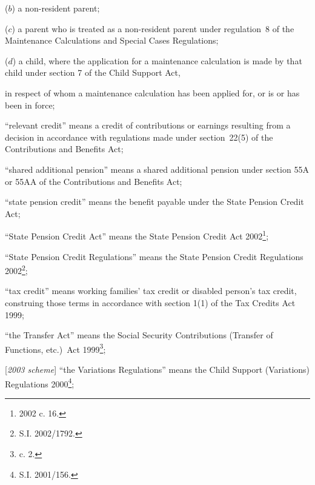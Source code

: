 \documentclass[12pt,a4paper]{article}
\begin{document}
\begin{enumerate}
\begin{enumerate}
    ($b$) 
    a non-resident parent;

    ($c$) 
    a parent who is treated as a non-resident parent under regulation~8 of the Maintenance Calculations and Special Cases Regulations;

    ($d$) 
    a child, where the application for a maintenance calculation is made by that child under section 7 of the Child Support Act,
\end{enumerate}
    in respect of whom a maintenance calculation has been applied for, 
or is or has been in force;

“relevant credit” means a credit of contributions or earnings resulting from a decision in accordance with regulations made under section~22(5) of the Contributions and Benefits Act;

“shared additional pension” means a shared additional pension under section 55A or 55AA of the Contributions and Benefits Act;

“state pension credit” means the benefit payable under the State Pension Credit Act;

“State Pension Credit Act” means the State Pension Credit Act 2002\footnote{2002 c. 16.};

“State Pension Credit Regulations” means the State Pension Credit Regulations 2002\footnote{S.I. 2002/1792.};

“tax credit” means working families' tax credit or disabled person’s tax credit, construing those terms in accordance with section 1(1) of the Tax Credits Act 1999;

“the Transfer Act” means the Social Security Contributions (Transfer of Functions, etc.)\ Act 1999\footnote{ c. 2.};

[\emph{2003 scheme}] “the Variations Regulations” means the Child Support (Variations) Regulations 2000\footnote{\frenchspacing S.I. 2001/156.};


\end{enumerate}
\end{document}
